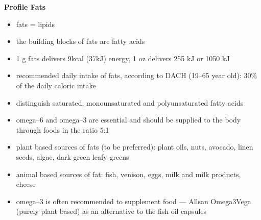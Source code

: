 \documentclass[../main.tex]{subfiles}
\begin{document}
 
\vspace{5mm}
\noindent
\begin{fminipage}{\textwidth}
  \textbf{Profile Fats}
  \begin{itemize}
  \item fats = lipids
  \item the building blocks of fats are fatty acids
  \item 1 g fats delivers 9kcal (37kJ) energy, 1 oz delivers 255 kJ or 1050 kJ
  \item recommended daily intake of fats, according to DACH (19--65 year old): 30\% of the daily caloric intake
  \item distinguish saturated, monounsaturated and polyunsaturated fatty acids
  \item omega--6 and omega--3 are essential and should be supplied to the body through foods in the ratio 5:1
  \item plant based sources of fats (to be preferred): plant oils, nuts, avocado, linen seeds, algae, dark green leafy greens
  \item animal based sources of fat: fish, venison, eggs, milk and milk products, cheese
    \item omega--3 is often recommended to supplement food --- Allsan Omega3Vega (purely plant based) as an alternative to the fish oil capsules 
  \end{itemize}
\end{fminipage}
\end{document}
